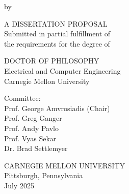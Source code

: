\begin{titlingpage}
\centering
{\Large\bfseries \thesisTitle\par}
\vfill
by\\
\thesisAuthor

\vfill
A DISSERTATION PROPOSAL\\
Submitted in partial fulfillment of\\
the requirements for the degree of

\vfill
DOCTOR OF PHILOSOPHY\\
Electrical and Computer Engineering\\
Carnegie Mellon University

\vfill
Committee:\\
Prof. George Amvrosiadis (Chair)\\
Prof. Greg Ganger\\
Prof. Andy Pavlo\\
Prof. Vyas Sekar\\
Dr. Brad Settlemyer

\vfill
CARNEGIE MELLON UNIVERSITY\\
Pittsburgh, Pennsylvania\\
July 2025
\end{titlingpage}
\restoregeometry




\tableofcontents
